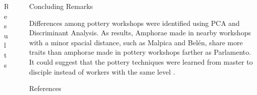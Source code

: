 \documentclass[final]{beamer}
\newlength{\sepwid}
\newlength{\onecolwid}
\newlength{\twocolwid}
\begin{document}
\begin{frame}[t]
\begin{columns}[t]
\begin{column}{\twocolwid}
\begin{block}{Results}
\begin{columns}
\end{columns}

\end{block} 


\begin{columns}[t,totalwidth=\twocolwid] %

\begin{column}{\onecolwid} %


\end{column} %

\begin{column}{\onecolwid} %


\end{column} %

\end{columns} %

\end{column} %





\begin{column}{\sepwid}\end{column} %

\begin{column}{\onecolwid} %

\begin{block}{Concluding Remarks}

Differences among pottery workshops were identified using PCA and Discriminant Analysis. As results, Amphorae made in nearby workshops with a minor spacial distance, such as Malpica and Bel\'en, share more traits than amphorae made in pottery workshops farther as Parlamento. It could suggest that the pottery techniques were learned from master to disciple instead of workers with the same level . 

\end{block}

\begin{block}{References}
\small


\end{block}
\end{column}
\end{columns}
\end{frame}
\end{document}
